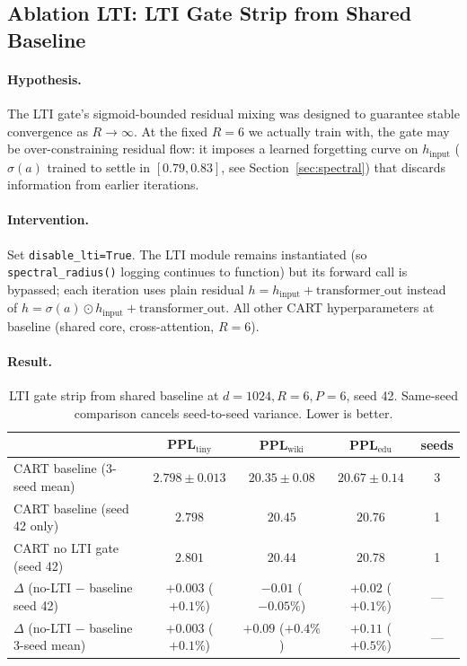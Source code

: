 \documentclass{article}
\newcommand{\cart}{\textsc{CART}}
\newcommand{\pplwiki}{PPL$_\text{wiki}$}
\newcommand{\ppltiny}{PPL$_\text{tiny}$}
\newcommand{\ppledu}{PPL$_\text{edu}$}
\begin{document}
\subsection{Ablation LTI: LTI Gate Strip from Shared Baseline}
\label{sec:abl_lti}

\paragraph{Hypothesis.}
The LTI gate's sigmoid-bounded residual mixing was designed to guarantee stable convergence as $R \to \infty$. At the fixed $R{=}6$ we actually train with, the gate may be over-constraining residual flow: it imposes a learned forgetting curve on $h_\text{input}$ ($\sigma(a)$ trained to settle in $[0.79, 0.83]$, see Section~\ref{sec:spectral}) that discards information from earlier iterations.

\paragraph{Intervention.}
Set \texttt{disable\_lti=True}. The LTI module remains instantiated (so \texttt{spectral\_radius()} logging continues to function) but its forward call is bypassed; each iteration uses plain residual $h = h_\text{input} + \text{transformer\_out}$ instead of $h = \sigma(a) \odot h_\text{input} + \text{transformer\_out}$. All other CART hyperparameters at baseline (shared core, cross-attention, $R{=}6$).

\paragraph{Result.}

\begin{table}[htbp]
\centering
\caption{LTI gate strip from shared baseline at $d{=}1024, R{=}6, P{=}6$, seed 42. Same-seed comparison cancels seed-to-seed variance. Lower is better.}
\label{tab:abl_lti}
\footnotesize
\begin{tabular}{lcccc}
\toprule
 & \ppltiny & \pplwiki & \ppledu & seeds \\
\midrule
\cart{} baseline (3-seed mean)                    & $2.798 \pm 0.013$ & $20.35 \pm 0.08$ & $20.67 \pm 0.14$ & 3 \\
\cart{} baseline (seed 42 only)                   & $2.798$           & $20.45$          & $20.76$          & 1 \\
\cart{} no LTI gate (seed 42)                     & $2.801$           & $20.44$          & $20.78$          & 1 \\
\midrule
$\Delta$ (no-LTI $-$ baseline seed 42)            & $+0.003$ ($+0.1\%$) & $-0.01$ ($-0.05\%$) & $+0.02$ ($+0.1\%$) & --- \\
$\Delta$ (no-LTI $-$ baseline 3-seed mean)        & $+0.003$ ($+0.1\%$) & $+0.09$ ($+0.4\%$) & $+0.11$ ($+0.5\%$) & --- \\
\bottomrule
\end{tabular}
\end{table}
\end{document}
